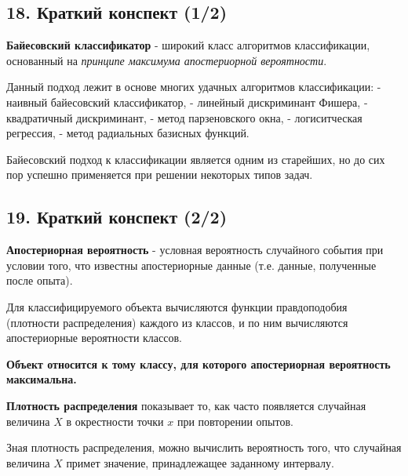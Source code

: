\subsection{18. Краткий конспект (1/2)}

\textbf{Байесовский классификатор} - широкий класс алгоритмов классификации,
основанный на \textit{принципе максимума апостериорной вероятности}.

Данный подход лежит в основе многих удачных алгоритмов классификации:
- наивный байесовский классификатор,
- линейный дискриминант Фишера,
- квадратичный дискриминант,
- метод парзеновского окна,
- логиситческая регрессия,
- метод радиальных базисных функций.

Байесовский подход к классификации является одним из старейших, но до сих
пор успешно применяется при решении некоторых типов задач.

\subsection{19. Краткий конспект (2/2)}

\textbf{Апостериорная вероятность} - условная вероятность случайного события при
условии того, что известны апостериорные данные (т.е. данные, полученные
после опыта).

Для классифицируемого объекта вычисляются функции правдоподобия (плотности
распределения) каждого из классов, и по ним вычисляются апостериорные
вероятности классов.

\textbf{Объект относится к тому классу, для которого апостериорная вероятность
максимальна.}

\textbf{Плотность распределения} показывает то, как часто появляется случайная
величина $X$ в окрестности точки $x$ при повторении опытов.

Зная плотность распределения, можно вычислить вероятность того, что
случайная величина $X$ примет значение, принадлежащее заданному интервалу.